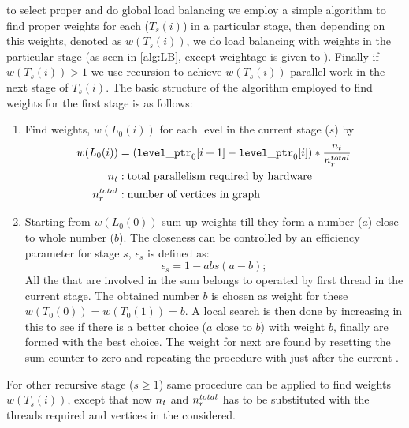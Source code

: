 \Inorder to select proper \subgraph and do global load balancing we employ a simple algorithm to find proper weights for each \levelGroup ($T_s(i)$) in a particular stage, then depending on this weights, denoted as $w(T_s(i))$, we do load balancing with weights in the particular stage (as seen in \cref{alg:LB}, except weightage is given to \levelGroups). Finally if $w(T_s(i)) > 1$ we use recursion to achieve $w(T_s(i))$ parallel work in the next stage of $T_s(i)$. The basic structure of the algorithm employed to find weights for the first stage is as follows:
\begin{enumerate}
	\item Find weights, $w(L_0(i))$ for each level in the current stage ($s$) by
		\begin{align*}
			w(L_0(i)) &= ({\tt level\_ptr}_0[i+1] - {\tt level\_ptr}_0[i])*\frac{n_{t}}{n_{r}^{total}}\\
			n_{t} &: \text{total parallelism required by hardware}\\
			n_{r}^{total} &: \text{number of vertices in graph}
		\end{align*}
	
	\item Starting from $w(L_0(0))$ sum up weights till they form a number ($a$) close to whole number ($b$). The closeness can be controlled by an efficiency parameter for stage $s$, $\epsilon_s$ is defined as:
	\begin{equation} \label{eq:epsilon}
		\epsilon_s =  1 - abs(a-b);
	\end{equation}
	All the \levels that are involved in the sum belongs to \levelGroups  operated by first thread in the current stage. The obtained number $b$ is chosen as weight for these \levelGroups \ie $w(T_0(0))=w(T_0(1))=b$. A local search is then done by increasing \levels in this \levelGroups to see if there is a better choice ($a$ close to $b$) with weight $b$, finally \levelGroups are formed with the best choice.  The weight for next \levelGroups are found by resetting the sum counter to zero and repeating the  procedure with \levels just after the current \levelGroups.
\end{enumerate}
For other recursive stage ($s\geq1$) same procedure can be applied to find weights $w(T_s(i))$, except that now $n_{t}$ and $n_{r}^{total}$ has to be substituted with the threads required and vertices in the \subgraph considered.